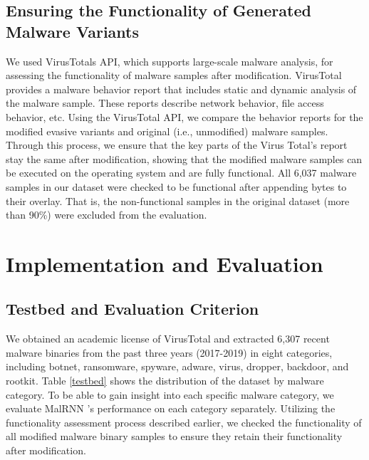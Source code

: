 \documentclass[letterpaper]{article}
\newcommand{\malrnn}{M\lowercase{a}lRNN }
\begin{document}
\subsection{Ensuring the Functionality of Generated Malware Variants} \label{ensure_func}
We used VirusTotals API, which supports large-scale malware analysis, for assessing the functionality of malware samples after modification. VirusTotal provides a malware behavior report that includes static and dynamic analysis of the malware sample. These reports describe network behavior, file access behavior, etc. Using the VirusTotal API, we compare the behavior reports for the modified evasive variants and original (i.e., unmodified) malware samples. Through this process, we ensure that the key parts of the Virus Total's report stay the same after modification, showing that the modified malware samples can be executed on the operating system and are fully functional. All 6,037 malware samples in our dataset were checked to be functional after appending bytes to their overlay. That is, the non-functional samples in the original dataset (more than 90\%) were excluded from the evaluation.

\section{Implementation and Evaluation}
\label{evaluation}
\subsection{Testbed and Evaluation Criterion}
\label{evaluation_criteria}
We obtained an academic license of VirusTotal and extracted 6,307 recent malware binaries from the past three years (2017-2019) in eight categories, including botnet, ransomware, spyware, adware, virus, dropper, backdoor, and rootkit. Table \ref{testbed} shows the distribution of the dataset by malware category. To be able to gain insight into each specific malware category, we evaluate \malrnn's performance on each category separately.
Utilizing the functionality assessment process described earlier, we checked the functionality of all modified malware binary samples to ensure they retain their functionality after modification. 
\end{document}
